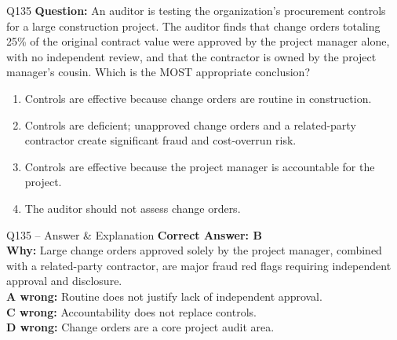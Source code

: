 \documentclass[aspectratio=169,10pt]{beamer}
\begin{document}
	\begin{frame}[t]{Q135}
		\small
		\textbf{Question:} An auditor is testing the organization's procurement controls for a large construction project. The auditor finds that change orders totaling 25\% of the original contract value were approved by the project manager alone, with no independent review, and that the contractor is owned by the project manager's cousin. Which is the MOST appropriate conclusion?
		\begin{enumerate}[label=\Alph*.,itemsep=1pt,topsep=2pt]
			\item Controls are effective because change orders are routine in construction.
			\item Controls are deficient; unapproved change orders and a related-party contractor create significant fraud and cost-overrun risk.
			\item Controls are effective because the project manager is accountable for the project.
			\item The auditor should not assess change orders.
		\end{enumerate}
	\end{frame}
	
	\begin{frame}[t]{Q135 -- Answer \& Explanation}
		\small
		\textbf{Correct Answer: B} \\[4pt]
		\textbf{Why:} Large change orders approved solely by the project manager, combined with a related-party contractor, are major fraud red flags requiring independent approval and disclosure. \\[4pt]
		\textbf{A wrong:} Routine does not justify lack of independent approval. \\[2pt]
		\textbf{C wrong:} Accountability does not replace controls. \\[2pt]
		\textbf{D wrong:} Change orders are a core project audit area.
	\end{frame}
	
\end{document}
